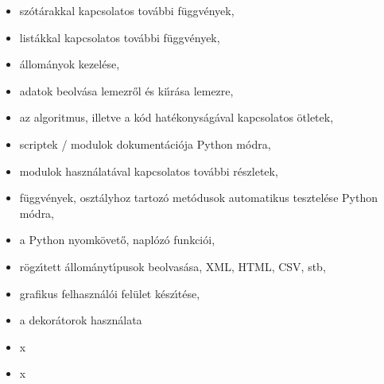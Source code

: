 \begin{itemize}
   \item{sz\'ot\'arakkal kapcsolatos tov\'abbi f\"uggv\'enyek,}
   \item{list\'akkal kapcsolatos tov\'abbi f\"uggv\'enyek,}      
   \item{\'allom\'anyok kezel\'ese,}
   \item{adatok beolv\'asa lemezr\H{o}l \'es ki\'{\i}r\'asa lemezre,}      
   \item{az algoritmus, illetve a k\'od hat\'ekonys\'ag\'aval kapcsolatos \"otletek,}
   \item{scriptek / modulok dokument\'aci\'oja Python m\'odra,}
   \item{modulok haszn\'alat\'aval kapcsolatos tov\'abbi r\'eszletek,}
   \item{f\"uggv\'enyek, oszt\'alyhoz tartoz\'o met\'odusok automatikus tesztel\'ese Python m\'odra,}
   \item{a Python nyomk\"ovet\H{o}, napl\'oz\'o funkci\'oi,}
   \item{r\"ogz\'{\i}tett \'allom\'anyt\'{\i}pusok beolvas\'asa, XML, HTML, CSV, stb,} 
   \item{grafikus felhaszn\'al\'oi fel\"ulet k\'esz\'{\i}t\'ese,}
   \item{a dekor\'atorok haszn\'alata}
   \item{x}
   \item{x}       
\end{itemize}

\printindex


  

